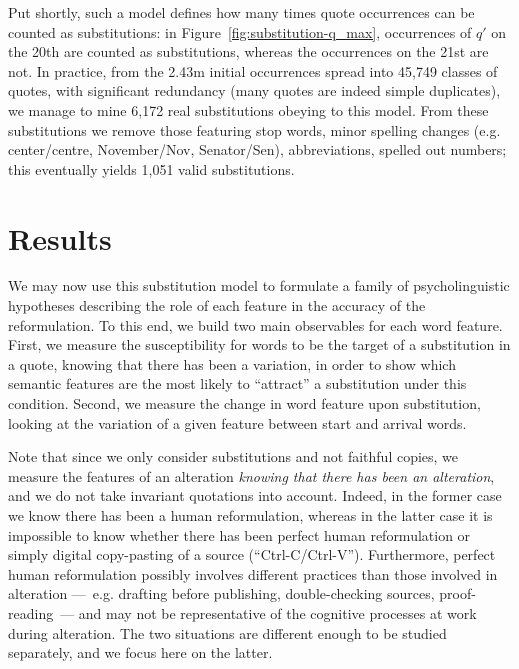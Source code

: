 \medskip
Put shortly, such a model defines how many times quote occurrences can be counted as substitutions: in Figure~\ref{fig:substitution-q_max}, occurrences of $q'$ on the 20th are counted as substitutions, whereas the occurrences on the 21st are not.  In practice, from the 2.43m initial occurrences spread into 45,749 classes of quotes, with significant redundancy (many quotes are indeed simple duplicates), we manage to mine 6,172 real substitutions obeying to this model. From these substitutions we remove those featuring stop words, minor spelling changes (e.g. center/centre, November/Nov, Senator/Sen), abbreviations, spelled out numbers; this eventually yields 1,051 valid substitutions.


\section{Results}\label{sec:results}

We may now use this substitution model to formulate a family of psycholinguistic hypotheses describing the role of each feature in the accuracy of the reformulation.  To this end, we build two main observables for each word feature.  
First, we measure the susceptibility for words to be the target of a substitution in a quote, knowing that there has been a variation, in order to show which semantic features are the most likely to ``attract'' a substitution under this condition. Second, we measure the change in word feature upon substitution, looking at the variation of a given feature between start and arrival words.

Note that since we only consider substitutions and not faithful copies, we measure the features of an alteration \emph{knowing that there has been an alteration}, and we do not take invariant quotations into account.
Indeed, in the former case we know there has been a human reformulation, whereas in the latter case it is impossible to know whether there has been perfect human reformulation or simply digital copy-pasting of a source (``{\sc Ctrl-C}/{\sc Ctrl-V}'').
Furthermore, perfect human reformulation possibly involves different practices than those involved in alteration ---~e.g. drafting before publishing, double-checking sources, proof-reading~--- and may not be representative of the cognitive processes at work during alteration.
The two situations are different enough to be studied separately, and we focus here on the latter.

